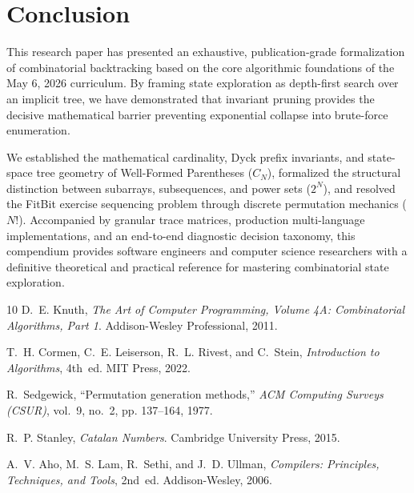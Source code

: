 \documentclass[10pt,journal,compsoc,onecolumn]{IEEEtran}
\begin{document}
\section{Conclusion}
\label{sec:conclusion}

This research paper has presented an exhaustive, publication-grade formalization of combinatorial backtracking based on the core algorithmic foundations of the May 6, 2026 curriculum. By framing state exploration as depth-first search over an implicit tree, we have demonstrated that invariant pruning provides the decisive mathematical barrier preventing exponential collapse into brute-force enumeration. 

We established the mathematical cardinality, Dyck prefix invariants, and state-space tree geometry of Well-Formed Parentheses ($C_N$), formalized the structural distinction between subarrays, subsequences, and power sets ($2^N$), and resolved the FitBit exercise sequencing problem through discrete permutation mechanics ($N!$). Accompanied by granular trace matrices, production multi-language implementations, and an end-to-end diagnostic decision taxonomy, this compendium provides software engineers and computer science researchers with a definitive theoretical and practical reference for mastering combinatorial state exploration.

\begin{thebibliography}{10}
D.~E. Knuth, \emph{The Art of Computer Programming, Volume 4A: Combinatorial Algorithms, Part 1}. Addison-Wesley Professional, 2011.

T.~H. Cormen, C.~E. Leiserson, R.~L. Rivest, and C.~Stein, \emph{Introduction to Algorithms}, 4th~ed. MIT Press, 2022.

R.~Sedgewick, ``Permutation generation methods,'' \emph{ACM Computing Surveys (CSUR)}, vol.~9, no.~2, pp. 137--164, 1977.

R.~P. Stanley, \emph{Catalan Numbers}. Cambridge University Press, 2015.

A.~V. Aho, M.~S. Lam, R.~Sethi, and J.~D. Ullman, \emph{Compilers: Principles, Techniques, and Tools}, 2nd~ed. Addison-Wesley, 2006.

\end{thebibliography}
\end{document}
